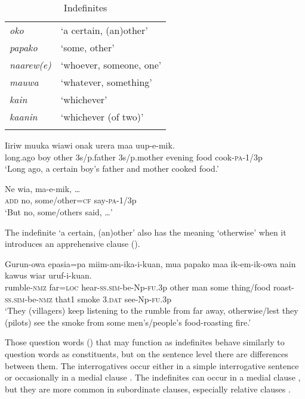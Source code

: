 \begin{table}
\caption{Indefinites}
\label{tab:3:indefinites}
 
\begin{tabular}{>{\itshape}ll}
\mytoprule
oko &`a certain, (an)other'\\
papako &`some, other'\\
naarew(e) &`whoever, someone, one'\\
mauwa &`whatever, something'\\
kain &`whichever'\\
kaanin &`whichever (of two)'\\
\mybottomrule
\end{tabular}
\end{table}


\ea%
\label{ex:3:x641}
\gll Iiriw muuka  wiawi onak urera maa uup-e-mik.\\
long.ago boy other 3s/p.father 3s/p.mother evening food cook-\textsc{pa}-1/3p\\
\glt`Long ago, a certain boy's father and mother cooked food.'
\z

\ea%
\label{ex:3:x642}
\gll Ne wia,  ma-e-mik, {\dots} \\
\textsc{add} no, some/other=\textsc{cf} say-\textsc{pa}-1/3p\\
\glt`But no, some/others said, {\dots}'
\z

The indefinite  `a certain, (an)other' also has the meaning `otherwise' when it introduces an apprehensive clause  ().

\ea%
\label{ex:3:x741}
\gll Gurun-owa epasia=pa miim-am-ika-i-kuan,  mua papako maa ik-em-ik-owa nain kawus wiar uruf-i-kuan.\\
rumble-\textsc{nmz} far=\textsc{loc} hear-\textsc{ss}.\textsc{sim}-be-Np-\textsc{fu}.3p other man some thing/food roast-\textsc{ss}.\textsc{sim}-be-\textsc{nmz} that1 smoke 3.\textsc{dat} see-Np-\textsc{fu}.3p\\
\glt`They (villagers) keep listening to the rumble from far away, otherwise/lest they (pilots) see the smoke from some men's/people's food-roasting fire.'
\z

Those question words () that may function as indefinites behave similarly to question words as  constituents, but on the sentence level there are differences between them. The interrogatives occur either in a simple interrogative sentence or occasionally in a medial clause . The indefinites can occur in a medial clause , but they are more common in subordinate clauses, especially relative clauses . 


